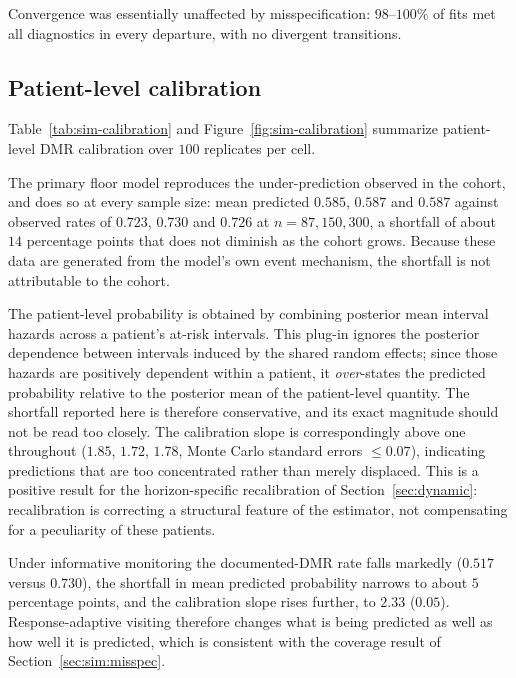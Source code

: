\documentclass[11pt]{article}
\begin{document}
Convergence was essentially unaffected by misspecification: $98$--$100\%$ of
fits met all diagnostics in every departure, with no divergent transitions.



\subsection{Patient-level calibration}
\label{sec:sim:calib}

Table~\ref{tab:sim-calibration} and Figure~\ref{fig:sim-calibration}
summarize patient-level DMR calibration over $100$ replicates per cell.

The primary floor model reproduces the under-prediction observed in the cohort,
and does so at every sample size: mean predicted $0.585$, $0.587$ and $0.587$
against observed rates of $0.723$, $0.730$ and $0.726$ at $n=87,150,300$, a
shortfall of about $14$ percentage points that does not diminish as the cohort
grows. Because these data are generated from the model's own event mechanism,
the shortfall is not attributable to the cohort.

The patient-level probability is obtained by combining posterior mean interval
hazards across a patient's at-risk intervals. This plug-in ignores the posterior
dependence between intervals induced by the shared random effects; since those
hazards are positively dependent within a patient, it \emph{over}-states the
predicted probability relative to the posterior mean of the patient-level
quantity. The shortfall reported here is therefore conservative, and its exact
magnitude should not be read too closely. The calibration slope is correspondingly above one throughout
($1.85$, $1.72$, $1.78$, Monte Carlo standard errors $\le0.07$), indicating
predictions that are too concentrated rather than merely displaced. This is a
positive result for the horizon-specific recalibration of
Section~\ref{sec:dynamic}: recalibration is correcting a structural feature of
the estimator, not compensating for a peculiarity of these patients.

Under informative monitoring the documented-DMR rate falls markedly ($0.517$
versus $0.730$), the shortfall in mean predicted probability narrows to about
$5$ percentage points, and the calibration slope rises further, to $2.33$
($0.05$). Response-adaptive visiting therefore changes what is being predicted
as well as how well it is predicted, which is consistent with the coverage
result of Section~\ref{sec:sim:misspec}.
\end{document}
